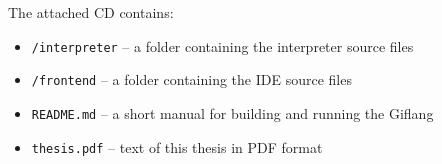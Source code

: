 The attached CD contains:
\begin{itemize}
    \item \texttt{/interpreter} -- a folder containing the interpreter source files
    \item \texttt{/frontend} -- a folder containing the IDE source files
    \item \texttt{README.md} -- a short manual for building and running the Giflang
    \item \texttt{thesis.pdf} -- text of this thesis in PDF format
\end{itemize}